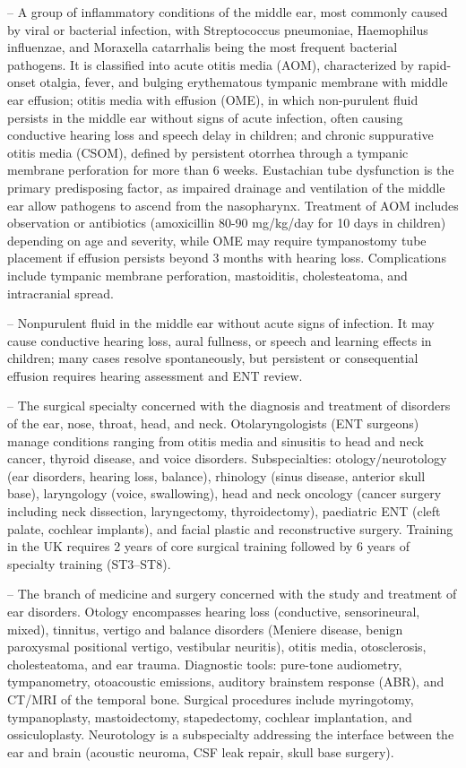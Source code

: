 -- A group of inflammatory conditions of the middle ear, most commonly caused by viral or bacterial infection, with Streptococcus pneumoniae, Haemophilus influenzae, and Moraxella catarrhalis being the most frequent bacterial pathogens. It is classified into acute otitis media (AOM), characterized by rapid-onset otalgia, fever, and bulging erythematous tympanic membrane with middle ear effusion; otitis media with effusion (OME), in which non-purulent fluid persists in the middle ear without signs of acute infection, often causing conductive hearing loss and speech delay in children; and chronic suppurative otitis media (CSOM), defined by persistent otorrhea through a tympanic membrane perforation for more than 6 weeks. Eustachian tube dysfunction is the primary predisposing factor, as impaired drainage and ventilation of the middle ear allow pathogens to ascend from the nasopharynx. Treatment of AOM includes observation or antibiotics (amoxicillin 80-90 mg/kg/day for 10 days in children) depending on age and severity, while OME may require tympanostomy tube placement if effusion persists beyond 3 months with hearing loss. Complications include tympanic membrane perforation, mastoiditis, cholesteatoma, and intracranial spread.

-- Nonpurulent fluid in the middle ear without acute signs of infection. It may cause conductive hearing loss, aural fullness, or speech and learning effects in children; many cases resolve spontaneously, but persistent or consequential effusion requires hearing assessment and ENT review.

-- The surgical specialty concerned with the diagnosis and treatment of disorders of the ear, nose, throat, head, and neck. Otolaryngologists (ENT surgeons) manage conditions ranging from otitis media and sinusitis to head and neck cancer, thyroid disease, and voice disorders. Subspecialties: otology/neurotology (ear disorders, hearing loss, balance), rhinology (sinus disease, anterior skull base), laryngology (voice, swallowing), head and neck oncology (cancer surgery including neck dissection, laryngectomy, thyroidectomy), paediatric ENT (cleft palate, cochlear implants), and facial plastic and reconstructive surgery. Training in the UK requires 2 years of core surgical training followed by 6 years of specialty training (ST3--ST8).

-- The branch of medicine and surgery concerned with the study and treatment of ear disorders. Otology encompasses hearing loss (conductive, sensorineural, mixed), tinnitus, vertigo and balance disorders (Meniere disease, benign paroxysmal positional vertigo, vestibular neuritis), otitis media, otosclerosis, cholesteatoma, and ear trauma. Diagnostic tools: pure-tone audiometry, tympanometry, otoacoustic emissions, auditory brainstem response (ABR), and CT/MRI of the temporal bone. Surgical procedures include myringotomy, tympanoplasty, mastoidectomy, stapedectomy, cochlear implantation, and ossiculoplasty. Neurotology is a subspecialty addressing the interface between the ear and brain (acoustic neuroma, CSF leak repair, skull base surgery).

